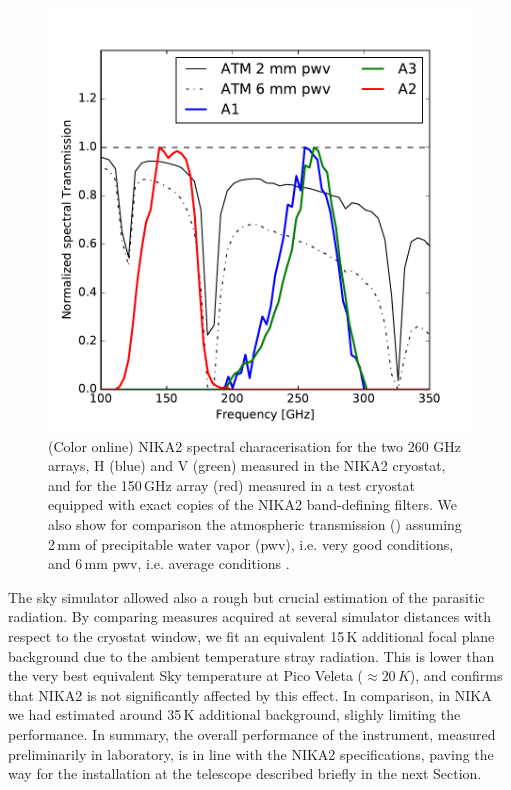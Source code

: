 \documentclass[]{aa} %
\begin{document}
\begin{figure}[h]
   \centering
    \includegraphics[width=1.0\linewidth]{atm_transmission.pdf}
      \caption{(Color online) NIKA2 spectral characerisation for the two 260 GHz arrays, H (blue) and V (green) measured in the NIKA2 cryostat, and for the 150\,GHz array (red) measured in a test cryostat equipped with exact copies of the NIKA2 band-defining filters. We also show for comparison the atmospheric transmission (\cite{Pardo2002}) assuming 2\,mm of precipitable water vapor (pwv), i.e. very good conditions, and 6\,mm pwv, i.e. average conditions .
         \label{Fig4}}
\end{figure}

The sky simulator allowed also a rough but crucial estimation of the parasitic radiation. By comparing measures acquired at several simulator distances with respect to the cryostat window, we fit an equivalent 15\,K additional focal plane background due to the ambient temperature stray radiation. This is lower than the very best equivalent Sky temperature at Pico Veleta ($\approx 20\,K$), and confirms that NIKA2 is not significantly affected by this effect. In comparison, in NIKA we had estimated around 35\,K additional background, slighly limiting the performance. 
In summary, the overall performance of the instrument, measured preliminarily in laboratory, is in line with the NIKA2 specifications, paving the way for the installation at the telescope described briefly in the next Section. 
\end{document}

